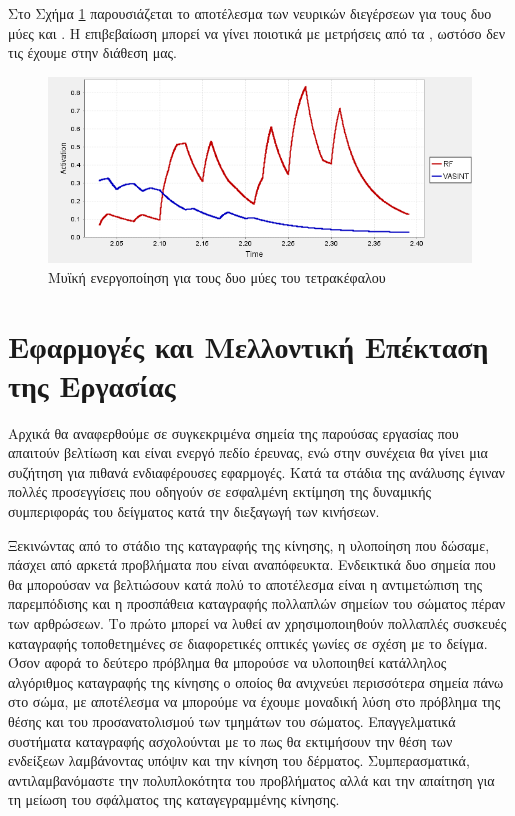 Στο Σχήμα \ref{fig:rf-vasint-activation} παρουσιάζεται το αποτέλεσμα των νευρικών διεγέρσεων για τους δυο μύες  και . Η επιβεβαίωση μπορεί να γίνει ποιοτικά με μετρήσεις από τα , ωστόσο δεν τις έχουμε στην διάθεση μας.

\begin{figure}[H]
    \centering
    \includegraphics[width=0.8\linewidth, keepaspectratio]{fig/rf-vasint-activation.png}
    \caption{Μυϊκή ενεργοποίηση για τους δυο μύες του τετρακέφαλου}
    \label{fig:rf-vasint-activation}
\end{figure}

\section{Εφαρμογές και Μελλοντική Επέκταση της Εργασίας}

Αρχικά θα αναφερθούμε σε συγκεκριμένα σημεία της παρούσας εργασίας που απαιτούν βελτίωση και είναι ενεργό πεδίο έρευνας, ενώ στην συνέχεια θα γίνει μια συζήτηση για πιθανά ενδιαφέρουσες εφαρμογές. Κατά τα στάδια της ανάλυσης έγιναν πολλές προσεγγίσεις που οδηγούν σε εσφαλμένη εκτίμηση της δυναμικής συμπεριφοράς του δείγματος κατά την διεξαγωγή των κινήσεων.

Ξεκινώντας από το στάδιο της καταγραφής της κίνησης, η υλοποίηση που δώσαμε, πάσχει από αρκετά προβλήματα που είναι αναπόφευκτα. Ενδεικτικά δυο σημεία που θα μπορούσαν να βελτιώσουν κατά πολύ το αποτέλεσμα είναι η αντιμετώπιση της παρεμπόδισης και η προσπάθεια καταγραφής πολλαπλών σημείων του σώματος πέραν των αρθρώσεων. Το πρώτο μπορεί να λυθεί αν χρησιμοποιηθούν πολλαπλές συσκευές καταγραφής τοποθετημένες σε διαφορετικές οπτικές γωνίες σε σχέση με το δείγμα. Όσον αφορά το δεύτερο πρόβλημα θα μπορούσε να υλοποιηθεί κατάλληλος αλγόριθμος καταγραφής της κίνησης ο οποίος θα ανιχνεύει περισσότερα σημεία πάνω στο σώμα, με αποτέλεσμα να μπορούμε να έχουμε μοναδική λύση στο πρόβλημα της θέσης και του προσανατολισμού των τμημάτων του σώματος. Επαγγελματικά συστήματα καταγραφής ασχολούνται με το πως θα εκτιμήσουν την θέση των ενδείξεων λαμβάνοντας υπόψιν και την κίνηση του δέρματος. Συμπερασματικά, αντιλαμβανόμαστε την πολυπλοκότητα του προβλήματος αλλά και την απαίτηση για τη μείωση του σφάλματος της καταγεγραμμένης κίνησης.

